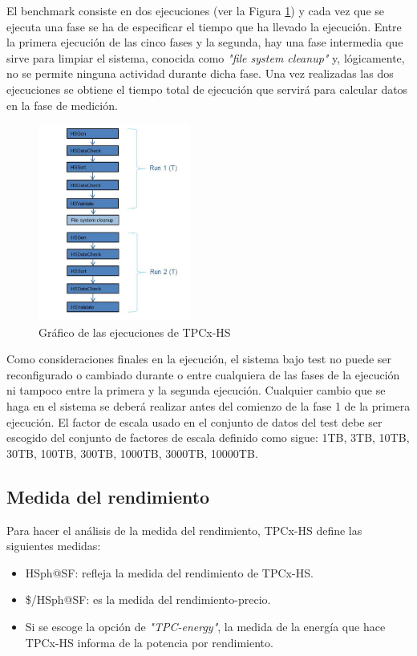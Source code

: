 \documentclass[10pt]{article}
\begin{document}
		El benchmark consiste en dos ejecuciones (ver la Figura \ref{fig:ejecucionesTPC}) y cada vez que se ejecuta una fase se ha de especificar el tiempo que ha llevado la ejecución. Entre la primera ejecución de las cinco fases y la segunda, hay una fase intermedia que sirve para limpiar el sistema, conocida como \textit{"file system cleanup"} y, lógicamente, no se permite ninguna actividad durante dicha fase. Una vez realizadas las dos ejecuciones se obtiene el tiempo total de ejecución que servirá para calcular datos en la fase de medición.
		
		\begin{figure}[h]
			\centering
			\includegraphics[width=5cm]{./images/executionsTPC.png}
			\caption{Gráfico de las ejecuciones de TPCx-HS} 
			\label{fig:ejecucionesTPC}
		\end{figure}
		
		Como consideraciones finales en la ejecución, el sistema bajo test no puede ser reconfigurado o cambiado durante o entre cualquiera de las fases de la ejecución ni tampoco entre la primera y la segunda ejecución. Cualquier cambio que se haga en el sistema se deberá realizar antes del comienzo de la fase 1 de la primera ejecución. El factor de escala usado en el conjunto de datos del test debe ser escogido del conjunto de factores de escala definido como sigue: 1TB, 3TB, 10TB, 30TB, 100TB, 300TB, 1000TB, 3000TB, 10000TB.
	
	\subsection{Medida del rendimiento}
	
		Para hacer el análisis de la medida del rendimiento, TPCx-HS define las siguientes medidas:
		
		\begin{itemize}
			\item HSph@SF: refleja la medida del rendimiento de TPCx-HS.
			\item \$/HSph@SF: es la medida del rendimiento-precio.
			\item Si se escoge la opción de \textit{"TPC-energy"}, la medida de la energía que hace TPCx-HS informa de la potencia por rendimiento. \\
		\end{itemize}
		
\end{document}

